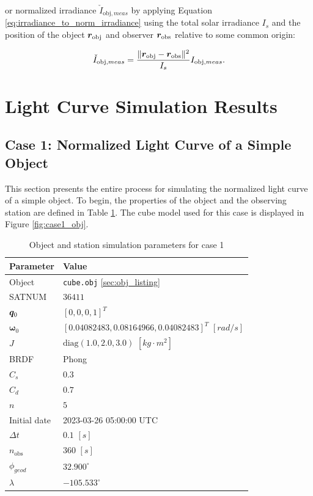 or normalized irradiance $\check{I}_{\mathrm{obj},meas}$ by applying Equation \ref{eq:irradiance_to_norm_irradiance} using the total solar irradiance $I_s$ and the position of the object $\bm{r}_\mathrm{obj}$ and observer $\bm{r}_\mathrm{obs}$ relative to some common origin:

\begin{equation} \label{eq:ihat_meas}
  \check{I}_{\mathrm{obj},meas} = \frac{\| \bm{r}_\mathrm{obj} - \bm{r}_\mathrm{obs} \|^2}{I_s} I_{\mathrm{obj},meas}.
\end{equation}

\section{Light Curve Simulation Results}

\subsection{Case 1: Normalized Light Curve of a Simple Object}

This section presents the entire process for simulating the normalized light curve of a simple object. To begin, the properties of the object and the observing station are defined in Table \ref{tb:case1_obj_props}. The cube model used for this case is displayed in Figure \ref{fig:case1_obj}.

\begin{table}[]
  \centering
  \begin{tabular}{|l|l|}
  \hline
  \textbf{Parameter} & \textbf{Value} \\ \hline
  Object & \texttt{cube.obj} \ref{sec:obj_listing} \\ \hline
  SATNUM & $36411$ \\ \hline
  $\bm{q}_0$ & $\left[ 0, 0, 0, 1 \right]^T$ \\ \hline
  $\boldsymbol{\omega}_0$ & $\left[ 0.04082483, 0.08164966, 0.04082483 \right]^T$ $[rad/s]$ \\ \hline
  $J$ & $\mathrm{diag}\left( 1.0, 2.0, 3.0 \right)$ $\left[ kg \cdot m^2 \right]$ \\ \hline
  BRDF & Phong \\ \hline
  $C_s$ & $0.3$ \\ \hline
  $C_d$ & $0.7$ \\ \hline
  $n$ & $5$ \\ \hline
  Initial date & 2023-03-26 05:00:00 UTC \\ \hline
  $\Delta t$ & $0.1$ $[s]$ \\ \hline
  $n_\mathrm{obs}$ & $360$ $[s]$ \\ \hline
  $\phi_{geod}$ & $32.900^\circ$ \\ \hline
  $\lambda$ & $-105.533^\circ$ \\ \hline
  \end{tabular}
  \caption{Object and station simulation parameters for case 1}
  \label{tb:case1_obj_props}
\end{table}


